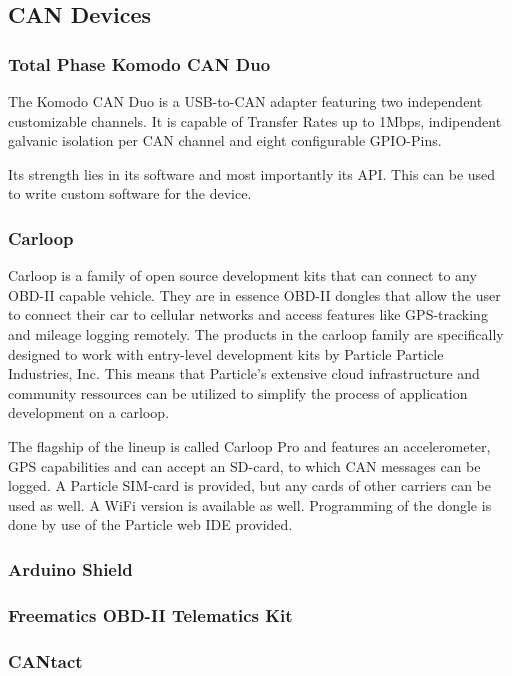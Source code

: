 \subsection{CAN Devices}
\subsubsection{Total Phase Komodo CAN Duo}
The Komodo CAN Duo is a USB-to-CAN adapter featuring two independent customizable channels. It is capable of Transfer Rates up to 1Mbps, indipendent galvanic isolation per CAN channel and eight configurable GPIO-Pins.

Its strength lies in its software and most importantly its API. This can be used to write custom software for the device.
\subsubsection{Carloop}
Carloop is a family of open source development kits that can connect to any OBD-II capable vehicle. They are in essence OBD-II dongles that allow the user to connect their car to cellular networks and access features like GPS-tracking and mileage logging remotely. The products in the carloop family are specifically designed to work with entry-level development kits by Particle Particle Industries, Inc. This means that Particle's extensive cloud infrastructure and community ressources can be utilized to simplify the process of application development on a carloop.

The flagship of the lineup is called Carloop Pro and features an accelerometer, GPS capabilities and can accept an SD-card, to which CAN messages can be logged. A Particle SIM-card is provided, but any cards of other carriers can be used as well. A WiFi version is available as well. Programming of the dongle is done by use of the Particle web IDE provided.

\subsubsection{Arduino Shield}
\subsubsection{Freematics OBD-II Telematics Kit}
\subsubsection{CANtact}
